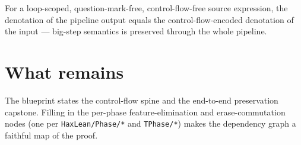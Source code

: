 \begin{theorem}
  \label{thm:pipeline-full}
  \leanok
  For a loop-scoped, question-mark-free, control-flow-free source expression,
  the denotation of the pipeline output equals the control-flow-encoded
  denotation of the input --- big-step semantics is preserved through the whole
  pipeline.
\end{theorem}

\section{What remains}

The blueprint states the control-flow spine and the end-to-end preservation
capstone. Filling in the per-phase feature-elimination and erase-commutation
nodes (one per \texttt{HaxLean/Phase/*} and \texttt{TPhase/*}) makes the
dependency graph a faithful map of the proof.
